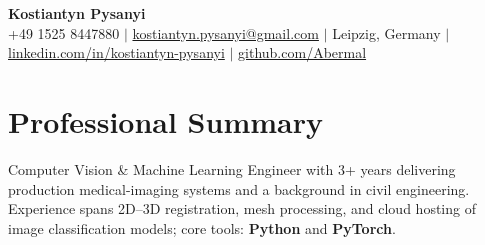 \documentclass[letterpaper,10pt]{article}
\begin{document}
\begin{center}
  \textbf{\Huge Kostiantyn Pysanyi}\vspace{4pt} \\
  \small +49 1525 8447880 $|$ \href{mailto:kostiantyn.pysanyi@gmail.com}{kostiantyn.pysanyi@gmail.com} $|$ Leipzig, Germany $|$
  \href{https://www.linkedin.com/in/kostiantyn-pysanyi/}{linkedin.com/in/kostiantyn-pysanyi} $|$ \href{https://github.com/Abermal}{github.com/Abermal}
\end{center}
\addtolength{\topmargin}{-0.12in}
\enlargethispage{0.35in}
\vspace{-8pt}

\titlespacing*{\section}{0pt}{4pt}{4pt}



\section{Professional Summary}
Computer Vision \& Machine Learning Engineer with 3+ years delivering production medical-imaging systems and a background in civil engineering. Experience spans 2D--3D registration, mesh processing, and cloud hosting of image classification models; core tools: \textbf{Python} and \textbf{PyTorch}.
\end{document}
